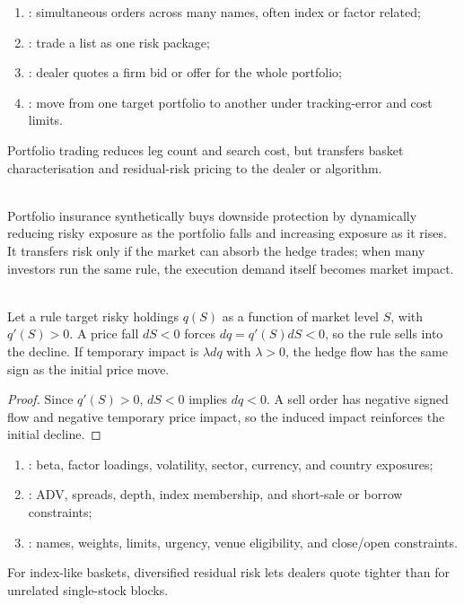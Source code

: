 \begin{taxonomy} 
\begin{enumerate}[label=\roman*.]
\setlength{\itemsep}{0pt}
\item {}: simultaneous orders across many names, often index or factor related;
\item {}: trade a list as one risk package;
\item {}: dealer quotes a firm bid or offer for the whole portfolio;
\item {}: move from one target portfolio to another under tracking-error and cost limits.
\end{enumerate}
Portfolio trading reduces leg count and search cost, but transfers basket characterisation and residual-risk pricing to the dealer or algorithm.
\end{taxonomy}

\begin{mechanism} \\
Portfolio insurance synthetically buys downside protection by dynamically reducing risky exposure as the portfolio falls and increasing exposure as it rises. It transfers risk only if the market can absorb the hedge trades; when many investors run the same rule, the execution demand itself becomes market impact.
\end{mechanism}

\begin{proposition} \\
Let a rule target risky holdings $q(S)$ as a function of market level $S$, with $q'(S)>0$. A price fall $dS<0$ forces $dq=q'(S)dS<0$, so the rule sells into the decline. If temporary impact is $\lambda dq$ with $\lambda>0$, the hedge flow has the same sign as the initial price move.
\begin{proof}
Since $q'(S)>0$, $dS<0$ implies $dq<0$. A sell order has negative signed flow and negative temporary price impact, so the induced impact reinforces the initial decline.
\end{proof}
\end{proposition}

\begin{taxonomy} 
\begin{enumerate}[label=\roman*.]
\setlength{\itemsep}{0pt}
\item {}: beta, factor loadings, volatility, sector, currency, and country exposures;
\item {}: ADV, spreads, depth, index membership, and short-sale or borrow constraints;
\item {}: names, weights, limits, urgency, venue eligibility, and close/open constraints.
\end{enumerate}
For index-like baskets, diversified residual risk lets dealers quote tighter than for unrelated single-stock blocks.
\end{taxonomy}


